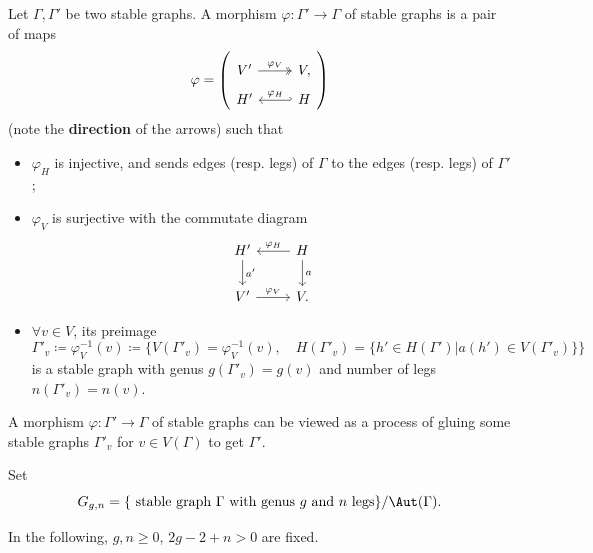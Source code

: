   \begin{definition}\label{def:morphisms_inverse_image_and_G_g_n_of_stable_graphs}
    Let $\Gamma,\Gamma'$ be two stable graphs.
    A morphism $\varphi: \Gamma' \to \Gamma$ of stable graphs is a pair of maps 
    \[ \varphi = \left( \begin{tikzcd}[row sep=1ex]
      V' \arrow[r, "\varphi_V", two heads] & V,\\
      H'  & H \arrow[l, "\varphi_H"', hook']
    \end{tikzcd} \right)
    \]
    (note the \textbf{direction} of the arrows) such that
    \begin{itemize}
      \item $\varphi_H$ is injective, and sends edges (resp. legs) of $\Gamma$ to the edges (resp. legs) of $\Gamma'$;
      \item $\varphi_V$ is surjective with the commutate diagram
        \[ \begin{tikzcd}
          H'  \arrow[d, "a'"] & H \arrow[d, "a"] \arrow[l, "\varphi_H"'] \\
          V' \arrow[r, "\varphi_V"] & V.
        \end{tikzcd} \]
      \item $\forall v \in V$, its preimage 
        \[ \Gamma'_v \coloneqq \varphi_V^{-1}(v) \coloneqq \bigg\{ V(\Gamma'_v) = \varphi_V^{-1}(v),\quad H(\Gamma'_v) = \{h' \in H(\Gamma') | a(h') \in V(\Gamma'_v)\} \bigg\} \]
        is a stable graph with genus $g(\Gamma'_v) = g(v)$ and number of legs $n(\Gamma'_v) = n(v)$.
    \end{itemize}
  \end{definition}

  \begin{example}
    \Yang{}
  \end{example}

  \begin{remark}
    A morphism $\varphi: \Gamma' \to \Gamma$ of stable graphs can be viewed as a process of gluing some stable graphs $\Gamma'_v$ for $v \in V(\Gamma)$ to get $\Gamma'$.
    \Yang{}
  \end{remark}

  Set 
    \[ G_{g,n} = \{\text{ stable graph } \Gamma \text{ with genus } g \text{ and } n \text{ legs}\}/ \Aut(\Gamma). \]

  \begin{example}
  \end{example}

  In the following, $g,n \geq 0$, $2g-2+n > 0$ are fixed.

